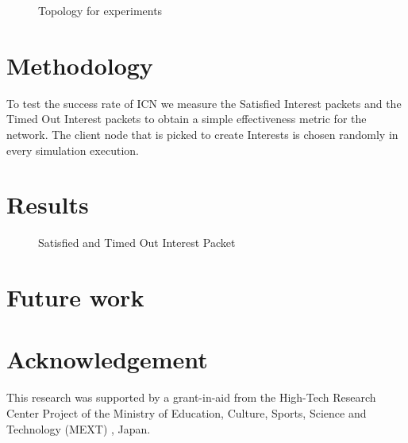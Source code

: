 \documentclass[twocolumn, a4paper]{ieicejsp}
\begin{document}
\begin{figure}[h]
\caption{Topology for experiments}
\label{fig:exptop}
\end{figure}

\section{Methodology}
To test the success rate of ICN we measure the Satisfied Interest packets and
the Timed Out Interest packets to obtain a simple effectiveness metric for the 
network.  
The client node that is picked to create Interests is chosen randomly in every
 simulation execution.



\section{Results}

\begin{figure}[h]
\caption{Satisfied and Timed Out Interest Packet}
\label{fig:sattimeint}
\end{figure}


\section{Future work}

\section*{Acknowledgement}
This research was supported by a grant-in-aid from the High-Tech Research
Center Project of the Ministry of Education, Culture, Sports, Science and
Technology (MEXT) \cite{mext:2014:Online}, Japan.



\end{document}
